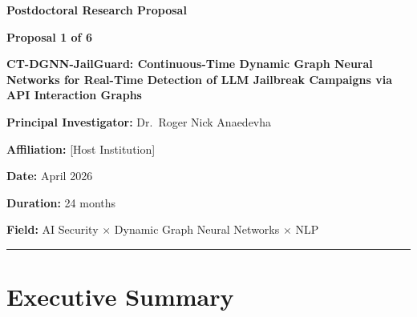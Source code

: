 \documentclass[12pt,a4paper]{article}
\begin{document}
\begin{center}
{\LARGE \textbf{Postdoctoral Research Proposal}}

\vspace{0.5cm}

{\Large \textbf{Proposal 1 of 6}}

\vspace{1cm}

{\huge \textbf{CT-DGNN-JailGuard: Continuous-Time Dynamic Graph Neural Networks for Real-Time Detection of LLM Jailbreak Campaigns via API Interaction Graphs}}

\vspace{1cm}

{\large \textbf{Principal Investigator:} Dr.\ Roger Nick Anaedevha}

\vspace{0.3cm}

{\large \textbf{Affiliation:} [Host Institution]}

\vspace{0.3cm}

{\large \textbf{Date:} April 2026}

\vspace{0.3cm}

{\large \textbf{Duration:} 24 months}

\vspace{0.3cm}

{\large \textbf{Field:} AI Security $\times$ Dynamic Graph Neural Networks $\times$ NLP}

\end{center}

\vspace{1cm}
\hrule
\vspace{0.5cm}

\tableofcontents

\newpage

\section{Executive Summary}
\end{document}
